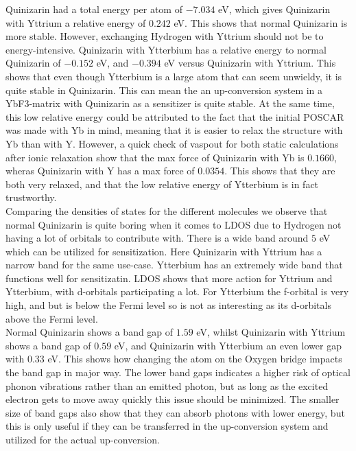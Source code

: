 \documentclass{article}
\begin{document}
    Quinizarin had a total energy per atom of $-7.034$ eV, which gives Quinizarin with Yttrium a relative energy of $0.242$ eV. This shows that normal Quinizarin is more stable. However, exchanging Hydrogen with Yttrium should not be to energy-intensive. Quinizarin with Ytterbium has a relative energy to normal Quinizarin of $-0.152$ eV, and $-0.394$ eV versus Quinizarin with Yttrium. This shows that even though Ytterbium is a large atom that can seem unwieldy, it is quite stable in Quinizarin. This can mean the an up-conversion system in a YbF3-matrix with Quinizarin as a sensitizer is quite stable. At the same time, this low relative energy could be attributed to the fact that the initial POSCAR was made with Yb in mind, meaning that it is easier to relax the structure with Yb than with Y. However, a quick check of vaspout for both static calculations after ionic relaxation show that the max force of Quinizarin with Yb is $0.1660$, wheras Quinizarin with Y has a max force of $0.0354$. This shows that they are both very relaxed, and that the low relative energy of Ytterbium is in fact trustworthy. \\

    Comparing the densities of states for the different molecules we observe that normal Quinizarin is quite boring when it comes to LDOS due to Hydrogen not having a lot of orbitals to contribute with. There is a wide band around $5$ eV which can be utilized for sensitization. Here Quinizarin with Yttrium has a narrow band for the same use-case. Ytterbium has an extremely wide band that functions well for sensitizatin. LDOS shows that more action for Yttrium and Ytterbium, with d-orbitals participating a lot. For Ytterbium the f-orbital is very high, and but is below the Fermi level so is not as interesting as its d-orbitals above the Fermi level. \\

    Normal Quinizarin shows a band gap of $1.59$ eV, whilst Quinizarin with Yttrium shows a band gap of $0.59$ eV, and Quinizarin with Ytterbium an even lower gap with $0.33$ eV. This shows how changing the atom on the Oxygen bridge impacts the band gap in major way. The lower band gaps indicates a higher risk of optical phonon vibrations rather than an emitted photon, but as long as the excited electron gets to move away quickly this issue should be minimized. The smaller size of band gaps also show that they can absorb photons with lower energy, but this is only useful if they can be transferred in the up-conversion system and utilized for the actual up-conversion. \\
\end{document}

